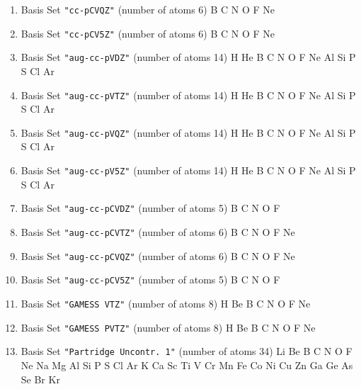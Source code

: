 \begin{enumerate}
\item Basis Set \verb#"cc-pCVQZ"# (number of atoms 6) \newline
  B C N O F Ne


\item Basis Set \verb#"cc-pCV5Z"# (number of atoms 6) \newline
  B C N O F Ne


\item Basis Set \verb#"aug-cc-pVDZ"# (number of atoms 14) \newline
  H He B C N O F Ne Al Si P S Cl Ar


\item Basis Set \verb#"aug-cc-pVTZ"# (number of atoms 14) \newline
  H He B C N O F Ne Al Si P S Cl Ar


\item Basis Set \verb#"aug-cc-pVQZ"# (number of atoms 14) \newline
  H He B C N O F Ne Al Si P S Cl Ar


\item Basis Set \verb#"aug-cc-pV5Z"# (number of atoms 14) \newline
  H He B C N O F Ne Al Si P S Cl Ar


\item Basis Set \verb#"aug-cc-pCVDZ"# (number of atoms 5) \newline
  B C N O F


\item Basis Set \verb#"aug-cc-pCVTZ"# (number of atoms 6) \newline
  B C N O F Ne


\item Basis Set \verb#"aug-cc-pCVQZ"# (number of atoms 6) \newline
  B C N O F Ne


\item Basis Set \verb#"aug-cc-pCV5Z"# (number of atoms 5) \newline
  B C N O F


\item Basis Set \verb#"GAMESS VTZ"# (number of atoms 8) \newline
  H Be B C N O F Ne


\item Basis Set \verb#"GAMESS PVTZ"# (number of atoms 8) \newline
  H Be B C N O F Ne


\item Basis Set \verb#"Partridge Uncontr. 1"# (number of atoms 34) \newline
  Li Be B C N O F Ne Na Mg Al Si P S Cl Ar K Ca Sc Ti V Cr Mn Fe Co
 Ni Cu Zn Ga Ge As Se Br Kr



\end{enumerate}
